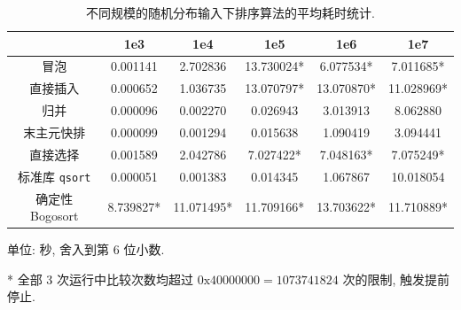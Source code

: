 \documentclass[12pt]{article}
\begin{document}
\begin{table}
\centering
\begin{threeparttable}
    \begin{tabular}{cccccc}
        \toprule
         & 1e3 & 1e4 & 1e5 & 1e6 & 1e7 \\
        \midrule
        冒泡 & 0.001141 & 2.702836 & 13.730024* & 6.077534* & 7.011685* \\
        直接插入 & 0.000652 & 1.036735 & 13.070797* & 13.070870* & 11.028969* \\
        归并 & 0.000096 & 0.002270 & 0.026943 & 3.013913 & 8.062880 \\
        末主元快排 & 0.000099 & 0.001294 & 0.015638 & 1.090419 & 3.094441 \\
        直接选择 & 0.001589 & 2.042786 & 7.027422* & 7.048163* & 7.075249* \\
        标准库 \texttt{qsort} & 0.000051 & 0.001383 & 0.014345 & 1.067867 & 10.018054 \\
        确定性 Bogosort & 8.739827* & 11.071495* & 11.709166* & 13.703622* & 11.710889* \\
        \bottomrule
    \end{tabular}
    \begin{tablenotes}
        \small
        \item 单位: 秒, 舍入到第 6 位小数.
        \item[*] 全部 3 次运行中比较次数均超过 $0\mathrm{x}40000000 = 1073741824$ 次的限制, 触发提前停止.
    \end{tablenotes}
    \caption{不同规模的随机分布输入下排序算法的平均耗时统计.}
    \label{table_result_random}
\end{threeparttable}
\end{table}
\end{document}
